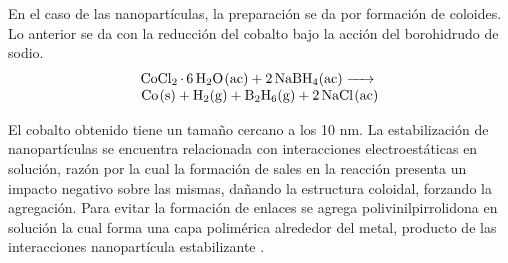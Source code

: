 \documentclass[fleqn,10pt]{SelfArx}
\begin{document}
En el caso de las nanopart\'iculas, la preparaci\'on se da por formaci\'on de coloides. Lo anterior se da con la reducci\'on del cobalto bajo la acci\'on del borohidrudo de sodio.
\begin{equation}
	\begin{array}{r}
		\ce{CoCl2.6H2O(ac) + 2NaBH4(ac) ->} \\
		\ce{Co(s) + H2(g) + B2H6(g) + 2NaCl(ac)}
	\end{array}	
\end{equation}

El cobalto obtenido tiene un tama\~no cercano a los 10 nm. La estabilizaci\'on de nanopart\'iculas se encuentra relacionada con interacciones electroest\'aticas en soluci\'on, raz\'on por la cual la formaci\'on de sales en la reacci\'on presenta un impacto negativo sobre las mismas, da\~nando la estructura coloidal, forzando la agregaci\'on. Para evitar la formaci\'on de enlaces  se agrega polivinilpirrolidona en soluci\'on la cual forma una capa polim\'erica alrededor del metal, producto de las interacciones nanopart\'icula estabilizante \cite{wang_qiao_chen_wang_ding_2005}.
\end{document}
